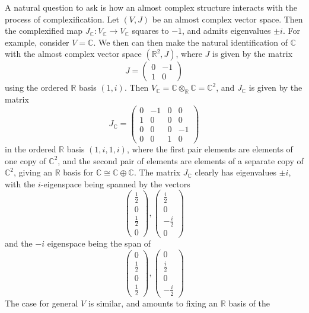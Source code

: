 \documentclass[psamsfonts, 12pt]{amsart}
\theoremstyle{definition}
\theoremstyle{remark}
\newcommand{\R}{\mathbb{R}}
\newcommand{\C}{\mathbb{C}}
\begin{document}
A natural question to ask is how an almost complex structure interacts with
the process of complexification. Let $(V,J)$ be an almost complex vector space. Then the
complexified map $J_\C : V_\C \to V_\C$ squares to $-1$, and admits eigenvalues
$\pm i$. For example, consider $V = \C$. We then can then make the natural
identification of $\C$ with the almost complex vector space $(\R^2, J)$, where $J$
is given by the matrix
\[
J = \begin{pmatrix}
0 & -1 \\
1 & 0
\end{pmatrix}
\]
using the ordered $\R$ basis $(1,i)$. Then $V_\C = \C \otimes_\R \C = \C^2$, and $J_\C$
is given by the matrix
\[
J_\C = \begin{pmatrix}
0 & -1 & 0 & 0 \\
1 & 0 & 0 & 0 \\
0 & 0 & 0 & -1 \\
0 & 0 & 1 & 0
\end{pmatrix}
\]
in the ordered $\R$ basis $(1, i, 1, i)$, where the first pair elements are elements of
one copy of $\C^2$, and the second pair of elements are elements of a separate copy of
$\C^2$, giving an $\R$ basis for $\C \cong \C \oplus \C$. The matrix $J_\C$
clearly has eigenvalues $\pm i$, with the $i$-eigenspace being spanned by the
vectors
\[
\begin{pmatrix}
\frac{1}{2} \\[5pt]
0 \\[5pt]
\frac{1}{2} \\[5pt]
0
\end{pmatrix}, \begin{pmatrix}
\frac{i}{2} \\[5pt]
0 \\[5pt]
-\frac{i}{2} \\[5pt]
0
\end{pmatrix}
\]
and the $-i$ eigenspace being the span of
\[
\begin{pmatrix}
0 \\[5pt]
\frac{1}{2} \\[5pt]
0 \\[5pt]
\frac{1}{2}
\end{pmatrix}, \begin{pmatrix}
0 \\[5pt]
\frac{i}{2} \\[5pt]
0 \\[5pt]
-\frac{i}{2}
\end{pmatrix}
\]
The case for general $V$ is similar, and amounts to fixing an $\R$ basis of the
\end{document}
